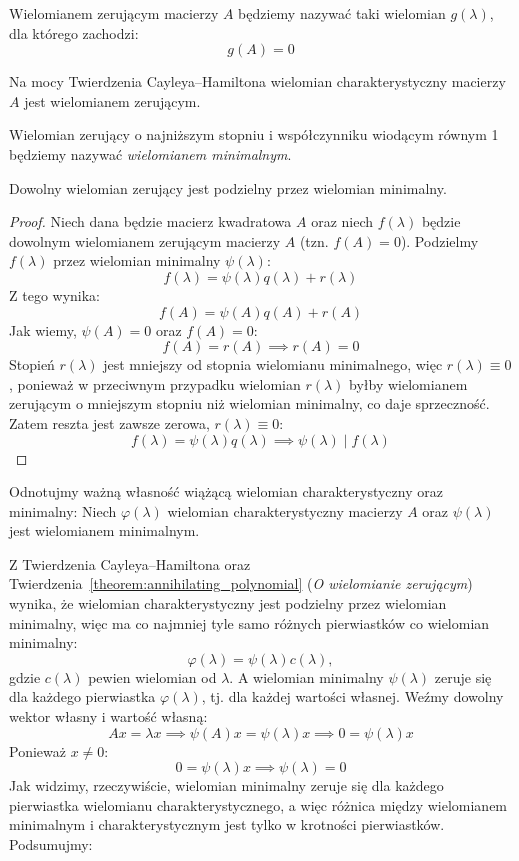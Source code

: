 \begin{definition}
     Wielomianem zerującym macierzy $A$ będziemy nazywać taki wielomian $g(\lambda)$, dla którego zachodzi:
     $$g(A) = 0$$
\end{definition}
Na mocy Twierdzenia Cayleya--Hamiltona \cite[Rozdział IV, \S 4, str. 83]{gantmacher2000} wielomian charakterystyczny macierzy $A$ jest wielomianem zerującym.
\begin{definition}
    Wielomian zerujący o najniższym stopniu i współczynniku wiodącym równym 1 będziemy nazywać \textit{wielomianem minimalnym}.
\end{definition}
\begin{theorem}\label{theorem:annihilating_polynomial}
    Dowolny wielomian zerujący jest podzielny przez wielomian minimalny.
\end{theorem}
\begin{proof}
Niech dana będzie macierz kwadratowa $A$ oraz niech $f(\lambda)$ będzie dowolnym wielomianem zerującym macierzy $A$ (tzn. $f(A) = 0$). Podzielmy $f(\lambda)$ przez wielomian minimalny $\psi(\lambda)$:
$$ f(\lambda) = \psi(\lambda)q(\lambda) + r(\lambda) $$
Z tego wynika:
$$ f(A) = \psi(A)q(A) + r(A) $$
Jak wiemy, $\psi(A) = 0$ oraz $f(A) = 0$:
$$ f(A) = r(A) \implies r(A) = 0 $$
Stopień $r(\lambda)$ jest mniejszy od stopnia wielomianu minimalnego, więc $r(\lambda) \equiv 0$, ponieważ w przeciwnym przypadku wielomian $r(\lambda)$ byłby wielomianem zerującym o mniejszym stopniu niż wielomian minimalny, co daje sprzeczność.
Zatem reszta jest zawsze zerowa, $r(\lambda) \equiv 0$:
$$f(\lambda) = \psi(\lambda)q(\lambda) \implies \psi(\lambda) \mid f(\lambda)$$
\end{proof}


Odnotujmy ważną własność wiążącą wielomian charakterystyczny oraz minimalny:
Niech $\varphi(\lambda)$ wielomian charakterystyczny macierzy $A$ oraz $\psi(\lambda)$ jest wielomianem minimalnym. 

Z Twierdzenia Cayleya--Hamiltona oraz Twierdzenia~\ref{theorem:annihilating_polynomial} (\textit{O wielomianie zerującym}) wynika, że wielomian charakterystyczny jest podzielny przez wielomian minimalny, więc ma co najmniej tyle samo różnych pierwiastków co wielomian minimalny:
$$ \varphi(\lambda) = \psi(\lambda)c(\lambda), $$
gdzie $c(\lambda)$ pewien wielomian od $\lambda$. A wielomian minimalny $\psi(\lambda)$ zeruje się dla każdego pierwiastka $\varphi(\lambda)$, tj. dla każdej wartości własnej. Weźmy dowolny wektor własny i wartość własną:
$$ Ax = \lambda x \implies \psi(A)x = \psi(\lambda)x \implies 0 = \psi(\lambda)x$$
Ponieważ $x \ne 0$:
$$0 = \psi(\lambda)x \implies \psi(\lambda) = 0$$
Jak widzimy, rzeczywiście, wielomian minimalny zeruje się dla każdego pierwiastka wielomianu charakterystycznego, a więc różnica między wielomianem minimalnym i charakterystycznym jest tylko w krotności pierwiastków. Podsumujmy:

